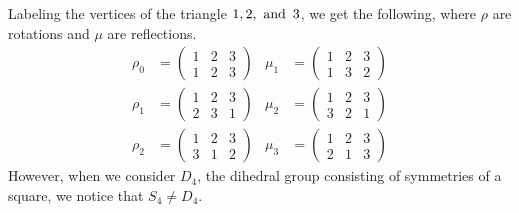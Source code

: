 Labeling the vertices of the triangle $1,2, \operatorname{~\text{and}~} 3$, we get the following, where $\rho$ are rotations and $\mu$ are reflections.
\begin{align*}
    \rho_0 & = \begin{pmatrix}
        1 & 2 & 3 \\
        1 & 2 & 3
    \end{pmatrix} & \mu_1 & = \begin{pmatrix}
        1 & 2 & 3 \\
        1 & 3 & 2
    \end{pmatrix} \\
    \rho_1 & = \begin{pmatrix}
        1 & 2 & 3 \\
        2 & 3 & 1
    \end{pmatrix} & \mu_2 & = \begin{pmatrix}
        1 & 2 & 3 \\
        3 & 2 & 1
    \end{pmatrix} \\
    \rho_2 & = \begin{pmatrix}
        1 & 2 & 3 \\
        3 & 1 & 2
    \end{pmatrix} & \mu_3 & = \begin{pmatrix}
        1 & 2 & 3 \\
        2 & 1 & 3
    \end{pmatrix}
\end{align*}
However, when we consider $D_4$, the dihedral group consisting of symmetries of a square, we notice that $S_4 \neq D_4$.